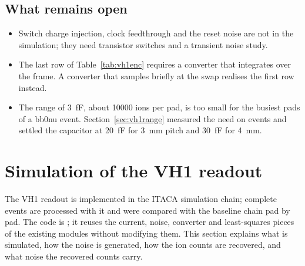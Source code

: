 \documentclass[11pt,a4paper]{article}
\newcommand{\code}[1]{\path{#1}}
\begin{document}
\subsection{What remains open}
\label{sec:vh1open}
%
\begin{itemize}
\item Switch charge injection, clock feedthrough and the reset noise are
  not in the simulation; they need transistor switches and a transient
  noise study.
\item The last row of Table~\ref{tab:vh1enc} requires a converter that
  integrates over the frame. A converter that samples briefly at the swap
  realises the first row instead.
\item The range of \SI{3}{fF}, about \SI{10000}{} ions per pad, is too
  small for the busiest pads of a bb0nu event. Section~\ref{sec:vh1range}
  measured the need on events and settled the capacitor at \SI{20}{fF} for
  \SI{3}{mm} pitch and \SI{30}{fF} for \SI{4}{mm}.
\end{itemize}

\section{Simulation of the VH1 readout}
\label{sec:vh1sim}
%
The VH1 readout is implemented in the ITACA simulation chain; complete
events are processed with it and were compared with the baseline chain pad
by pad. The code
is \code{src/vh1/VH1Readout.jl}; it reuses the current, noise, converter and
least-squares pieces of the existing modules without modifying them. This
section explains what is simulated, how the noise is generated, how the ion
counts are recovered, and what noise the recovered counts carry.

\end{document}
